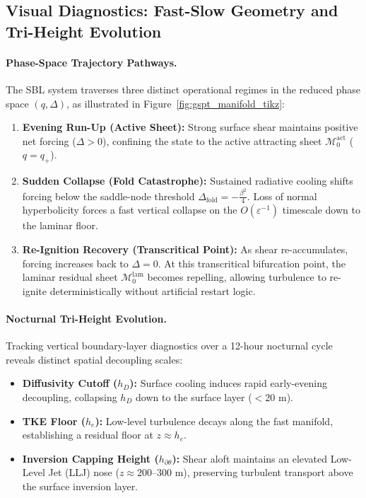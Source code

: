 \documentclass[11pt,letterpaper]{article}
\begin{document}
\subsection{Visual Diagnostics: Fast-Slow Geometry and Tri-Height Evolution}
\label{subsec:visual_phase_space_ascii}

\paragraph{Phase-Space Trajectory Pathways.}
The SBL system traverses three distinct operational regimes in the reduced phase space $(q, \Delta)$, as illustrated in Figure~\ref{fig:gspt_manifold_tikz}:
\begin{enumerate}
    \item \textbf{Evening Run-Up (Active Sheet):} Strong surface shear maintains positive net forcing ($\Delta > 0$), confining the state to the active attracting sheet $\mathcal{M}_0^{\text{act}}$ ($q = q_+$).
    \item \textbf{Sudden Collapse (Fold Catastrophe):} Sustained radiative cooling shifts forcing below the saddle-node threshold $\Delta_{\text{fold}} = -\frac{\beta^2}{4}$. Loss of normal hyperbolicity forces a fast vertical collapse on the $O(\varepsilon^{-1})$ timescale down to the laminar floor.
    \item \textbf{Re-Ignition Recovery (Transcritical Point):} As shear re-accumulates, forcing increases back to $\Delta = 0$. At this transcritical bifurcation point, the laminar residual sheet $\mathcal{M}_0^{\text{lam}}$ becomes repelling, allowing turbulence to re-ignite deterministically without artificial restart logic.
\end{enumerate}

\paragraph{Nocturnal Tri-Height Evolution.}
Tracking vertical boundary-layer diagnostics over a 12-hour nocturnal cycle reveals distinct spatial decoupling scales:
\begin{itemize}
    \item \textbf{Diffusivity Cutoff ($h_D$):} Surface cooling induces rapid early-evening decoupling, collapsing $h_D$ down to the surface layer ($< 20\text{ m}$).
    \item \textbf{TKE Floor ($h_e$):} Low-level turbulence decays along the fast manifold, establishing a residual floor at $z \approx h_e$.
    \item \textbf{Inversion Capping Height ($h_{\partial \theta}$):} Shear aloft maintains an elevated Low-Level Jet (LLJ) nose ($z \approx 200\text{--}300\text{ m}$), preserving turbulent transport above the surface inversion layer.
\end{itemize}
\end{document}
